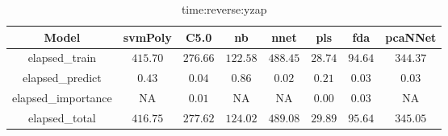 \begin{table}[!ht]
	\centering
	\begin{tabular}{|c|c|c|c|c|c|c|c|}
		\hline
		Model & svmPoly & C5.0 & nb & nnet & pls & fda & pcaNNet \\ \hline
		elapsed_train & $415.70$ & $276.66$ & $122.58$ & $488.45$ & $28.74$ & $94.64$ & $344.37$ \\ \hline
		elapsed_predict & $0.43$ & $0.04$ & $0.86$ & $0.02$ & $0.21$ & $0.03$ & $0.03$ \\ \hline
		elapsed_importance & NA & $0.01$ & NA & NA & $0.00$ & $0.03$ & NA \\ \hline
		elapsed_total & $416.75$ & $277.62$ & $124.02$ & $489.08$ & $29.89$ & $95.64$ & $345.05$ \\ \hline
	\end{tabular}
	\caption{time:reverse:yzap}
	\label{tab:time:reverse:yzap}
\end{table}
